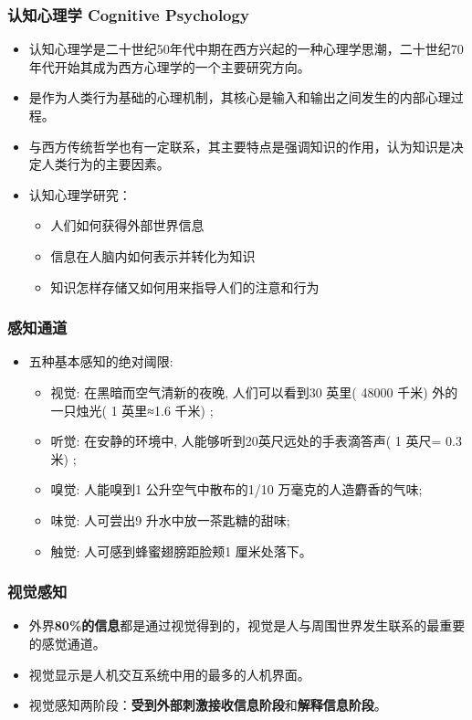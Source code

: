 \documentclass{beamer}
\begin{document}
\begin{frame}
	\frametitle{认知心理学 Cognitive Psychology}
	\beamertemplatetransparentcovereddynamicmedium 
	\begin{itemize}
		\item 认知心理学是二十世纪50年代中期在西方兴起的一种心理学思潮，二十世纪70年代开始其成为西方心理学的一个主要研究方向。\pause
		\item 是作为人类行为基础的心理机制，其核心是输入和输出之间发生的内部心理过程。\pause
		\item 与西方传统哲学也有一定联系，其主要特点是强调知识的作用，认为知识是决定人类行为的主要因素。\pause
		\item 认知心理学研究：
		\begin{itemize}
			\item 人们如何获得外部世界信息
			\item 信息在人脑内如何表示并转化为知识
			\item 知识怎样存储又如何用来指导人们的注意和行为
		\end{itemize}
	\end{itemize}
\end{frame}

\begin{frame}
	\frametitle{感知通道}
	\beamertemplatetransparentcovereddynamicmedium 
	\begin{itemize}[<+->]
		\item 五种基本感知的绝对阈限:
		\begin{itemize}
			\item 视觉: 在黑暗而空气清新的夜晚, 人们可以看到30 英里( 48000 千米) 外的一只烛光( 1 英里≈1.6 千米) ; 
			\item 听觉: 在安静的环境中, 人能够听到20英尺远处的手表滴答声( 1 英尺= 0.3 米) ; 
			\item 嗅觉: 人能嗅到1 公升空气中散布的1/10 万毫克的人造麝香的气味; 
			\item 味觉: 人可尝出9 升水中放一茶匙糖的甜味; 
			\item 触觉: 人可感到蜂蜜翅膀距脸颊1 厘米处落下。
		\end{itemize}
	\end{itemize}
\end{frame}

\begin{frame}
	\frametitle{视觉感知}
	\beamertemplatetransparentcovereddynamicmedium 
	\begin{itemize}[<+->]
		\item 外界\textbf{80\%的信息}都是通过视觉得到的，视觉是人与周围世界发生联系的最重要的感觉通道。
		\item 视觉显示是人机交互系统中用的最多的人机界面。
		\item 视觉感知两阶段：\textbf{受到外部刺激接收信息阶段}和\textbf{解释信息阶段}。
	\end{itemize}	
\end{frame}
\end{document}
